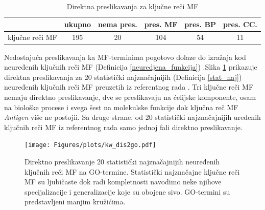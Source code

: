\begin{table}[htpb]
\begin{tabular}{|r|c|c|c|c|c|}
  \hline
                   & ukupno & nema pres. & pres. MF & pres. BP & pres. CC.      \\
  \hline
   ključne reči MF & 195    &  20       &  104     & 54      & 11           \\
  \hline
\end{tabular}
  \centering
  \caption{Direktna preslikavanja za ključne reči MF}
  \label{tab:direktna_map}
\end{table}

Nedostajuća preslikavanja ka MF-terminima pogotovo dolaze do izražaja kod
neuređenih ključnih reči MF (Definicija \ref{neuredjena_funkcija}) .Slika
\ref{fig:KWtop20dis} prikazuje direktna preslikavanja za 20 statistički
najznačajnijih (Definicija \ref{stat_naj}) neuređenih ključnih  reči MF
preuzetih iz referentnog rada \parencite{Xie2007}.  Tri ključne reči MF nemaju
direktno preslikavanje, dve se preslikavaju na ćelijske komponente, osam na
biološke procese i svega šest na molekulske funkcije dok ključna reč MF
\textit{Antigen} više ne postojii. Sa druge strane, od 20 statistički
najznačajnijih uređenih ključnih reči MF iz referentnog rada samo jednoj fali
direktno preslikavanje.

\begin{figure}[!th]
\centering
\hspace*{-1.5cm} 
\texttt{[image: Figures/plots/kw\_dis2go.pdf]}
\caption {
  Direktno preslikavanje 20 statistički najznačajnijih neuređenih ključnih reči MF
  \parencite{Xie2007} na GO-termine.  Statistički najznačajne ključne reči MF su
  ljubičaste dok radi kompletnosti navodimo neke njihove specijalizacije i
  generalizacije koje su obojene sivo. GO-termini su predstavljeni manjim
  kružićima.
}
\label{fig:KWtop20dis}
\end{figure}

